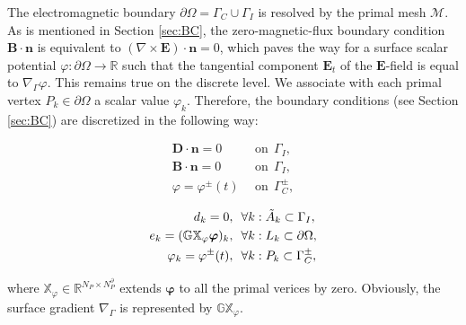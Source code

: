\documentclass{article}
\begin{document}
The electromagnetic boundary $\partial\Omega = \Gamma_C\cup \Gamma_I$ is resolved by the
primal mesh $\mathcal{M}$. As is mentioned in Section \ref{sec:BC}, the zero-magnetic-flux
boundary condition $\mathbf{B}\cdot \mathbf{n}$ is equivalent to
$(\nabla\times\mathbf{E}) \cdot \mathbf{n} = 0$, which paves the way for a surface scalar
potential $\varphi:\partial\Omega\to\mathbb{R}$ such that the tangential component
$\mathbf{E}_t$ of the $\mathbf{E}$-field is equal to $\nabla_\Gamma\varphi$. This remains
true on the discrete level. We associate with each primal vertex $P_k \in \partial\Omega$
a scalar value $\varphi_k$. Therefore, the boundary conditions (see Section \ref{sec:BC})
are discretized in the following way:
\begin{center}
    \vspace{-0.5cm}
    \begin{minipage}{0.3\textwidth}
    \begin{align*}
    \mathbf{D} \cdot \mathbf{n} = 0\ \ &\text{on} \ \  \Gamma_I,  \\
    \mathbf{B} \cdot \mathbf{n} = 0\ \  &\text{on} \ \  \Gamma_I, \\
    \varphi = \varphi^\pm(t)\ \ &\text{on} \ \ \Gamma_C^\pm,
    \end{align*}
    \end{minipage}
    \begin{minipage}{0.1\textwidth}
    \centering
    \end{minipage}
    \begin{minipage}{0.5\textwidth}
        \centering
        \begin{subequations}
            \begin{align}
            d_k = 0,\ \ &\forall k : \Tilde{A}_k \subset \Gamma_I,\label{equ:bc_3} \\
            e_k = (\mathbb{GX}_\varphi\bm{\varphi})_k,\ \ &\forall k : L_k \subset \partial\Omega, \label{equ:bc_2}\\
            \varphi_k = \varphi^\pm(t), \ \ &\forall k : P_k \subset \Gamma_C^\pm, \label{equ:bc_1}
            \end{align}
        \end{subequations}
    \end{minipage}
\end{center}
where $\mathbb{X}_\varphi \in \mathbb{R}^{N_P \times N_P^\partial}$ extends $\bm{\varphi}$
to all the primal verices by zero. Obviously, the surface gradient $\nabla_\Gamma$ is
represented by $\mathbb{GX}_\varphi$.
\end{document}
